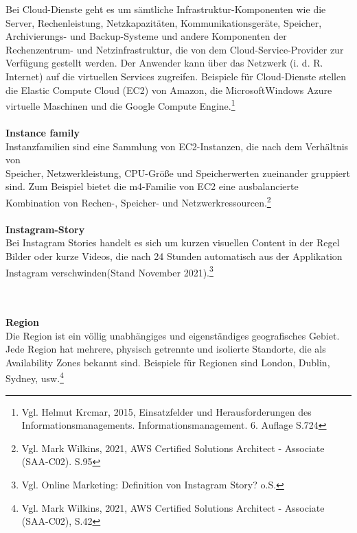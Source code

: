 Bei Cloud-Dienste geht es um sämtliche
Infrastruktur-Komponenten wie die Server, Rechenleistung, Netzkapazitäten, Kommunikationsgeräte, Speicher, Archivierungs- und Backup-Systeme und andere Komponenten der Rechenzentrum- und Netzinfrastruktur, die von dem Cloud-Service-Provider zur Verfügung gestellt werden. Der Anwender kann über das Netzwerk (i. d. R. Internet) auf die virtuellen Services zugreifen. Beispiele für Cloud-Dienste stellen die Elastic Compute Cloud (EC2) von Amazon, die MicrosoftWindows Azure virtuelle Maschinen und die Google Compute Engine.\footnote{Vgl. Helmut Krcmar, 2015, Einsatzfelder und Herausforderungen des Informationsmanagements. Informationsmanagement. 6. Auflage S.724\cite{IM1}}
\\\\
\textbf{Instance family}\\
Instanzfamilien sind eine Sammlung von EC2-Instanzen, die nach dem Verhältnis von\\ Speicher, Netzwerkleistung, CPU-Größe und Speicherwerten zueinander gruppiert sind. Zum Beispiel bietet die m4-Familie von EC2 eine ausbalancierte Kombination von Rechen-, Speicher- und Netzwerkressourcen.\footnote{Vgl. Mark Wilkins, 2021, AWS Certified Solutions Architect - Associate (SAA-C02). S.95\cite{AWS1}}
\\\\
\textbf{Instagram-Story}\\
Bei Instagram Stories handelt es sich um kurzen visuellen Content in der Regel Bilder oder kurze Videos, die nach 24 Stunden automatisch aus der Applikation Instagram verschwinden(Stand November 2021).\footnote{Vgl. Online Marketing: Definition von Instagram Story? o.S.\cite{IG2}}

\\\\
\textbf{Region}\\
Die Region ist ein völlig unabhängiges und eigenständiges geografisches Gebiet. Jede Region hat mehrere, physisch getrennte und isolierte Standorte, die als Availability Zones bekannt sind. Beispiele für Regionen sind London, Dublin, Sydney, usw.\footnote{Vgl. Mark Wilkins, 2021, AWS Certified Solutions Architect - Associate (SAA-C02)\cite{AWS1}, S.42}
